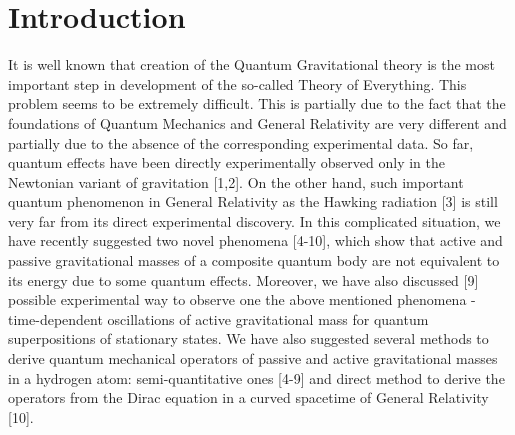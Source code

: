 \documentclass{ws-ijmpd}
\begin{document}



\section{Introduction}
It is well known that creation of the Quantum Gravitational theory
is the most important step in development of the so-called Theory
of Everything. This problem seems to be extremely difficult.
This is partially due to the fact that the foundations of Quantum
Mechanics and General Relativity are very different and partially
due to the absence of the corresponding experimental data. So far,
quantum effects have been directly experimentally observed only in
the Newtonian variant of gravitation [1,2]. On the other hand,
such important quantum phenomenon in General Relativity as the
Hawking radiation [3] is still very far from its direct
experimental discovery. In this complicated situation, we have
recently suggested two novel phenomena [4-10], which show that
active and passive gravitational masses of a composite quantum
body are not equivalent to its energy due to some quantum effects.
Moreover, we have also discussed [9] possible experimental way to observe
one the above mentioned phenomena - time-dependent oscillations of
active gravitational mass for quantum superpositions of stationary
states. We have also suggested several methods to derive quantum
mechanical operators of passive and active gravitational masses in
a hydrogen atom: semi-quantitative ones [4-9] and direct method to
derive the operators from the Dirac equation in a curved spacetime
of General Relativity [10].
\end{document}
